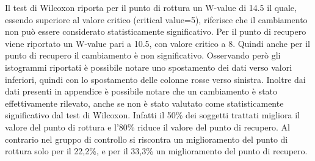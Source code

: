 Il test di Wilcoxon riporta per il punto di rottura un W-value di 14.5 il quale, essendo superiore al valore critico (critical value=5), riferisce che il cambiamento non può essere considerato statisticamente significativo. Per il punto di recupero viene riportato un W-value pari a 10.5, con valore critico a 8. Quindi anche per il punto di recupero il cambiamento è non significativo. Osservando però gli istogrammi riportati è possibile notare uno spostamento dei dati verso valori inferiori, quindi con lo spostamento delle colonne rosse verso sinistra. Inoltre dai dati presenti in appendice è possibile notare che un cambiamento è stato effettivamente rilevato, anche se non è stato valutato come statisticamente significativo dal test di Wilcoxon. Infatti il 50\% dei soggetti trattati migliora il valore del punto di rottura e l’80\% riduce il valore del punto di recupero. Al contrario nel gruppo di controllo si riscontra un miglioramento del punto di rottura solo per il 22,2\%, e per il 33,3\% un miglioramento del punto di recupero.
